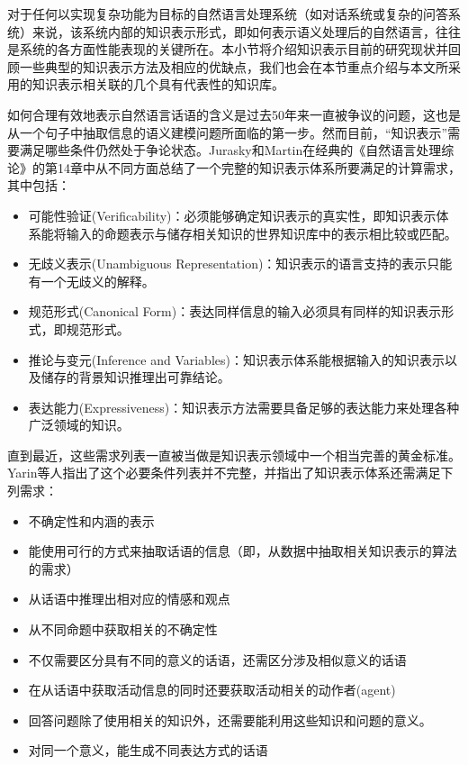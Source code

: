 对于任何以实现复杂功能为目标的自然语言处理系统（如对话系统或复杂的问答系统）来说，该系统内部的知识表示形式，即如何表示语义处理后的自然语言，往往是系统的各方面性能表现的关键所在。本小节将介绍知识表示目前的研究现状并回顾一些典型的知识表示方法及相应的优缺点，我们也会在本节重点介绍与本文所采用的知识表示相关联的几个具有代表性的知识库。

如何合理有效地表示自然语言话语的含义是过去50年来一直被争议的问题，这也是从一个句子中抽取信息的语义建模问题所面临的第一步。然而目前，“知识表示”需要满足哪些条件仍然处于争论状态。Jurasky和Martin在经典的《自然语言处理综论》\cite{Jurafsky2009}的第14章中从不同方面总结了一个完整的知识表示体系所要满足的计算需求，其中包括：

\begin{itemize}
\item 可能性验证(Verificability)：必须能够确定知识表示的真实性，即知识表示体系能将输入的命题表示与储存相关知识的世界知识库中的表示相比较或匹配。
\item 无歧义表示(Unambiguous Representation)：知识表示的语言支持的表示只能有一个无歧义的解释。
\item 规范形式(Canonical Form)：表达同样信息的输入必须具有同样的知识表示形式，即规范形式。
\item 推论与变元(Inference and Variables)：知识表示体系能根据输入的知识表示以及储存的背景知识推理出可靠结论。
\item 表达能力(Expressiveness)：知识表示方法需要具备足够的表达能力来处理各种广泛领域的知识。
\end{itemize}

直到最近，这些需求列表一直被当做是知识表示领域中一个相当完善的黄金标准。Yarin等人\cite{Yarin2013}指出了这个必要条件列表并不完整，并指出了知识表示体系还需满足下列需求：

\begin{itemize}
\item 不确定性和内涵的表示
\item 能使用可行的方式来抽取话语的信息（即，从数据中抽取相关知识表示的算法的需求）  
\item 从话语中推理出相对应的情感和观点
\item 从不同命题中获取相关的不确定性
\item 不仅需要区分具有不同的意义的话语，还需区分涉及相似意义的话语
\item 在从话语中获取活动信息的同时还要获取活动相关的动作者(agent)
\item 回答问题除了使用相关的知识外，还需要能利用这些知识和问题的意义。
\item 对同一个意义，能生成不同表达方式的话语
\end{itemize}

